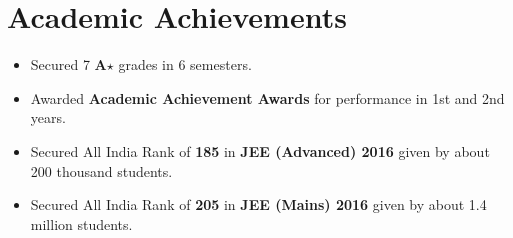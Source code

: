 \section*{Academic Achievements}
\begin{itemize}

\setlength\itemsep{0pt}
\item Secured 7 \textbf{A$\star$} grades in 6 semesters.
\item Awarded \textbf{Academic Achievement Awards} for performance in 1st and 2nd years.
\item Secured All India Rank of {\bf 185} in {\bf JEE (Advanced) 2016} given by about 200 thousand students.
\item Secured All India Rank of {\bf 205} in {\bf JEE (Mains) 2016} given by about 1.4 million students.

\end{itemize}
